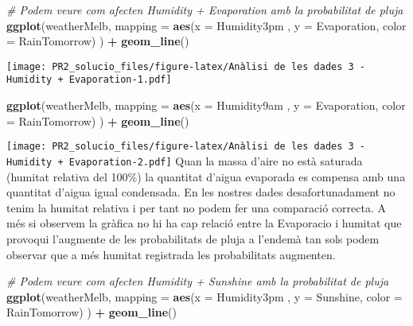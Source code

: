 \documentclass[
]{article}
\newenvironment{Shaded}{\begin{snugshade}}{\end{snugshade}}
\newcommand{\CommentTok}[1]{\textcolor[rgb]{0.56,0.35,0.01}{\textit{#1}}}
\newcommand{\DataTypeTok}[1]{\textcolor[rgb]{0.13,0.29,0.53}{#1}}
\newcommand{\KeywordTok}[1]{\textcolor[rgb]{0.13,0.29,0.53}{\textbf{#1}}}
\newcommand{\NormalTok}[1]{#1}
\newcommand{\OperatorTok}[1]{\textcolor[rgb]{0.81,0.36,0.00}{\textbf{#1}}}
\newcommand{\StringTok}[1]{\textcolor[rgb]{0.31,0.60,0.02}{#1}}
\begin{document}
\begin{Shaded}
\begin{Highlighting}[]
\CommentTok{# Podem veure com afecten Humidity + Evaporation amb la probabilitat de pluja}
\KeywordTok{ggplot}\NormalTok{(weatherMelb, }\DataTypeTok{mapping =} \KeywordTok{aes}\NormalTok{(}\DataTypeTok{x =}\NormalTok{ Humidity3pm , }\DataTypeTok{y =}\NormalTok{ Evaporation, }\DataTypeTok{color =}\NormalTok{ RainTomorrow) ) }\OperatorTok{+}\StringTok{ }\KeywordTok{geom_line}\NormalTok{()}
\end{Highlighting}
\end{Shaded}

\texttt{[image: PR2\_solucio\_files/figure-latex/Anàlisi de les dades 3 - Humidity + Evaporation-1.pdf]}

\begin{Shaded}
\begin{Highlighting}[]
\KeywordTok{ggplot}\NormalTok{(weatherMelb, }\DataTypeTok{mapping =} \KeywordTok{aes}\NormalTok{(}\DataTypeTok{x =}\NormalTok{ Humidity9am , }\DataTypeTok{y =}\NormalTok{ Evaporation, }\DataTypeTok{color =}\NormalTok{ RainTomorrow) ) }\OperatorTok{+}\StringTok{ }\KeywordTok{geom_line}\NormalTok{()}
\end{Highlighting}
\end{Shaded}

\texttt{[image: PR2\_solucio\_files/figure-latex/Anàlisi de les dades 3 - Humidity + Evaporation-2.pdf]}
Quan la massa d'aire no està saturada (humitat relativa del 100\%) la
quantitat d'aigua evaporada es compensa amb una quantitat d'aigua igual
condensada. En les nostres dades desafortunadament no tenim la humitat
relativa i per tant no podem fer una comparació correcta. A més si
observem la gràfica no hi ha cap relació entre la Evaporacio i humitat
que provoqui l'augmente de les probabilitats de pluja a l'endemà tan
sols podem observar que a més humitat registrada les probabilitats
augmenten.

\begin{Shaded}
\begin{Highlighting}[]
\CommentTok{# Podem veure com afecten Humidity + Sunshine amb la probabilitat de pluja}
\KeywordTok{ggplot}\NormalTok{(weatherMelb, }\DataTypeTok{mapping =} \KeywordTok{aes}\NormalTok{(}\DataTypeTok{x =}\NormalTok{ Humidity3pm , }\DataTypeTok{y =}\NormalTok{ Sunshine, }\DataTypeTok{color =}\NormalTok{ RainTomorrow) ) }\OperatorTok{+}\StringTok{ }\KeywordTok{geom_line}\NormalTok{()}
\end{Highlighting}
\end{Shaded}
\end{document}
